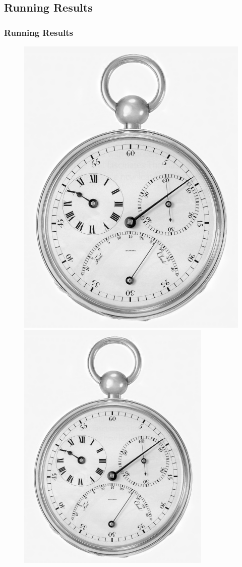 \documentclass[notheorems,serif,table,compress]{beamer}  %
\begin{document}
\subsection{Running Results}
\begin{frame}
\frametitle{Running Results}
\begin{figure}
        \begin{minipage}[t]{0.4\linewidth}
        \centering
        \includegraphics[width=0.7\linewidth]{1250dpi.jpg} 
        \end{minipage}
        \begin{minipage}[t]{0.4\linewidth}
        \centering
        \includegraphics[width=0.7\linewidth]{300dpi.jpg} 

\end{minipage}
\end{figure}
\end{frame}
\end{document}
